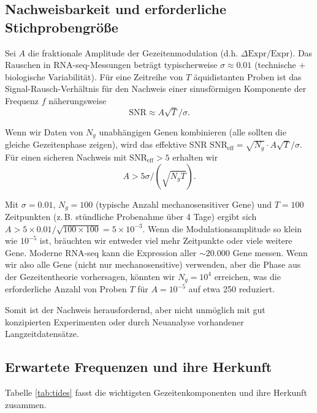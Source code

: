 \documentclass[12pt,a4paper]{article}
\theoremstyle{remark}
\begin{document}
	\subsection{Nachweisbarkeit und erforderliche Stichprobengröße}
	
	Sei \(A\) die fraktionale Amplitude der Gezeitenmodulation (d.h. \(\Delta\text{Expr}/\text{Expr}\)). Das Rauschen in RNA-seq-Messungen beträgt typischerweise \(\sigma \approx 0.01\) (technische + biologische Variabilität). Für eine Zeitreihe von \(T\) äquidistanten Proben ist das Signal-Rausch-Verhältnis für den Nachweis einer sinusförmigen Komponente der Frequenz \(f\) näherungsweise
	\[
	\mathrm{SNR} \approx A \sqrt{T} / \sigma .
	\]
	
	Wenn wir Daten von \(N_g\) unabhängigen Genen kombinieren (alle sollten die gleiche Gezeitenphase zeigen), wird das effektive SNR \(\mathrm{SNR}_{\text{eff}} = \sqrt{N_g} \cdot A \sqrt{T} / \sigma\). Für einen sicheren Nachweis mit \(\mathrm{SNR}_{\text{eff}} > 5\) erhalten wir
	\[
	A > 5 \sigma / (\sqrt{N_g T}).
	\]
	
	Mit \(\sigma = 0.01\), \(N_g = 100\) (typische Anzahl mechanosensitiver Gene) und \(T = 100\) Zeitpunkten (z. B. stündliche Probenahme über 4 Tage) ergibt sich \(A > 5\times 0.01 / \sqrt{100\times 100} = 5\times 10^{-3}\). Wenn die Modulationsamplitude so klein wie \(10^{-5}\) ist, bräuchten wir entweder viel mehr Zeitpunkte oder viele weitere Gene. Moderne RNA-seq kann die Expression aller \(\sim 20.000\) Gene messen. Wenn wir also alle Gene (nicht nur mechanosensitive) verwenden, aber die Phase aus der Gezeitentheorie vorhersagen, könnten wir \(N_g = 10^4\) erreichen, was die erforderliche Anzahl von Proben \(T\) für \(A = 10^{-5}\) auf etwa 250 reduziert.
	
	Somit ist der Nachweis herausfordernd, aber nicht unmöglich mit gut konzipierten Experimenten oder durch Neuanalyse vorhandener Langzeitdatensätze.
	
	\subsection{Erwartete Frequenzen und ihre Herkunft}
	
	Tabelle \ref{tab:tides} fasst die wichtigsten Gezeitenkomponenten und ihre Herkunft zusammen.
	
\end{document}
